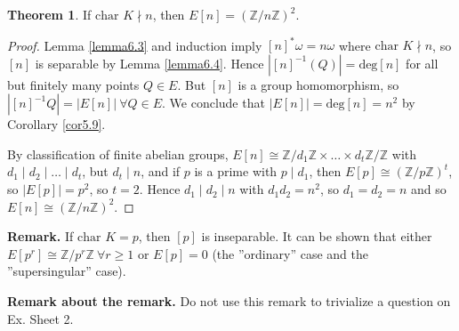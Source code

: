 \documentclass{article}
\theoremstyle{definition}
\newtheorem{theorem}{Theorem}[section]
\begin{document}
\begin{theorem}\label{theorem6.5}
    If $\text{char }K \nmid n$, then $E[n] = (\mathbb{Z}/n\mathbb{Z})^2$.
\end{theorem}
\begin{proof}
    Lemma \ref{lemma6.3} and induction imply $[n]^* \omega = n \omega$ where $\text{char }K \nmid n$, so $[n]$ is separable by Lemma \ref{lemma6.4}. Hence $\left|[n]^{-1}(Q)\right| = \text{deg}[n]$ for all but finitely many points $Q \in E$. But $[n]$ is a group homomorphism, so $\left|[n]^{-1} Q\right| = \left|E[n]\right| ~\forall Q \in E$. We conclude that $\left|E[n]\right|=\text{deg}[n] = n^2$ by Corollary \ref{cor5.9}.
    \vspace{1mm}
     
    By classification of finite abelian groups, $E[n] \cong \mathbb{Z}/d_1\mathbb{Z} \times \ldots \times d_t\mathbb{Z}/\mathbb{Z}$ with $d_1 \mid d_2 \mid \ldots \mid d_t$, but $d_t \mid n$, and if $p$ is a prime with $p \mid d_1$, then $E[p] \cong (\mathbb{Z}/p\mathbb{Z})^t$, so $\left|E[p]\right| = p^2$, so $t=2$. Hence $d_1 \mid d_2 \mid n$ with $d_1d_2=n^2$, so $d_1=d_2=n$ and so $E[n] \cong (\mathbb{Z}/n\mathbb{Z})^2$.
\end{proof}
\textbf{Remark.} If $\text{char }K = p$, then $[p]$ is inseparable. It can be shown that either $E[p^r] \cong \mathbb{Z}/p^r \mathbb{Z} ~\forall r\ge 1$ or $E[p] = 0$ (the ''ordinary'' case and the ''supersingular'' case).

\textbf{Remark about the remark.} Do not use this remark to trivialize a question on Ex. Sheet 2.
\end{document}
